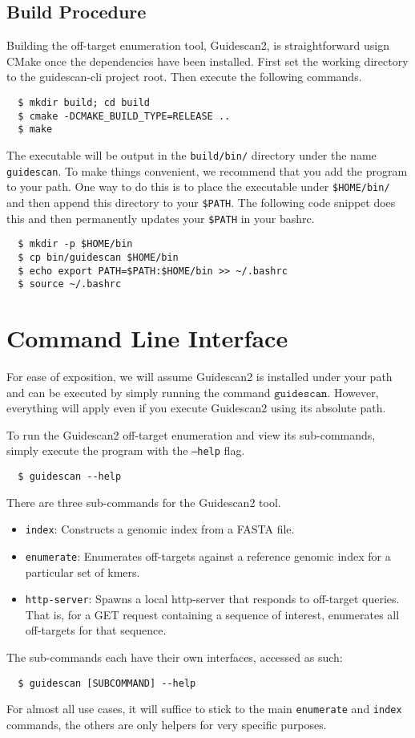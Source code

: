 \documentclass[11pt]{article}
\begin{document}
\subsection{Build Procedure}
Building the off-target enumeration tool, Guidescan2, is
straightforward usign CMake once the dependencies have been
installed. First set the working directory to the guidescan-cli
project root. Then execute the following commands.

\begin{verbatim}
  $ mkdir build; cd build
  $ cmake -DCMAKE_BUILD_TYPE=RELEASE ..
  $ make
\end{verbatim}

The executable will be output in the \texttt{build/bin/} directory
under the name \texttt{guidescan}. To make things convenient, we
recommend that you add the program to your path. One way to do this is
to place the executable under \texttt{\$HOME/bin/} and then append
this directory to your
\texttt{\$PATH}. The following code snippet does this and then
permanently updates your \texttt{\$PATH} in your bashrc.

\begin{verbatim}
  $ mkdir -p $HOME/bin
  $ cp bin/guidescan $HOME/bin
  $ echo export PATH=$PATH:$HOME/bin >> ~/.bashrc
  $ source ~/.bashrc
\end{verbatim}

\section{Command Line Interface}
For ease of exposition, we will assume Guidescan2 is installed under
your path and can be executed by simply running the command
$\texttt{guidescan}$. However, everything will apply even if you
execute Guidescan2 using its absolute path.

To run the Guidescan2 off-target enumeration and view its
sub-commands, simply execute the program with the \texttt{--help}
flag.
\begin{verbatim}
  $ guidescan --help
\end{verbatim}

There are three sub-commands for the Guidescan2 tool. 
\begin{itemize}
\item \texttt{index}: Constructs a genomic index from a FASTA file.
\item \texttt{enumerate}: Enumerates off-targets against a reference
  genomic index for a particular set of kmers. 
\item \texttt{http-server}: Spawns a local http-server that responds
  to off-target queries. That is, for a GET request containing a
  sequence of interest, enumerates all off-targets for that sequence.
\end{itemize}
The sub-commands each have their own interfaces, accessed as such:
\begin{verbatim}
  $ guidescan [SUBCOMMAND] --help
\end{verbatim}
For almost all use cases, it will suffice to stick to the main
\texttt{enumerate} and \texttt{index} commands, the others are only
helpers for very specific purposes.
\end{document}
